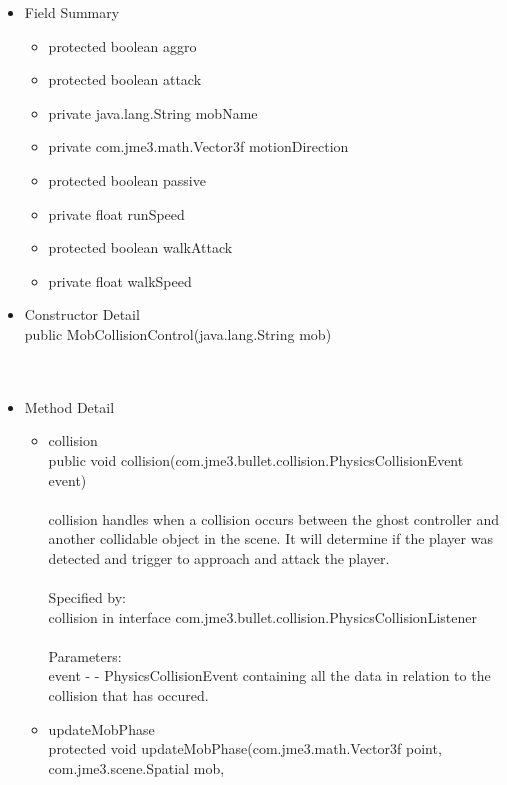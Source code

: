 \documentclass[letterpaper]{article}
\begin{document}
					\begin{itemize}
						\item	Field Summary
								\begin{itemize}
									\item	protected boolean	aggro 
									\item	protected boolean	attack 
									\item	private java.lang.String	mobName 
									\item	private com.jme3.math.Vector3f	motionDirection 
									\item	protected boolean	passive 
									\item	private float	runSpeed 
									\item	protected boolean	walkAttack 
									\item	private float	walkSpeed 
								\end{itemize}
						\item	Constructor Detail \\
								public MobCollisionControl(java.lang.String mob) \\ \\ \\
						\item	Method Detail
								\begin{itemize}
									\item	collision \\
											public void collision(com.jme3.bullet.collision.PhysicsCollisionEvent event) \\ \\
											collision handles when a collision occurs between the ghost controller and another collidable object in the scene. It will determine if the player was detected and trigger to approach and attack the player. \\ \\
											Specified by: \\
											collision in interface com.jme3.bullet.collision.PhysicsCollisionListener \\ \\
											Parameters: \\
											event - - PhysicsCollisionEvent containing all the data in relation to the collision that has occured.
									\item	updateMobPhase \\
											protected void updateMobPhase(com.jme3.math.Vector3f point, \\
		                  com.jme3.scene.Spatial mob, \\

\end{itemize}
\end{itemize}
\end{document}
